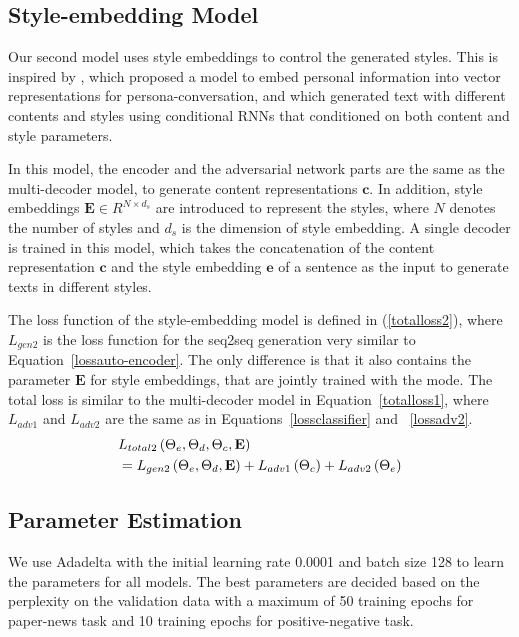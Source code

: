 \documentclass[letterpaper]{article} \usepackage{aaai18}  \usepackage{times}  \usepackage{helvet}  \usepackage{courier}  \usepackage{url}  \usepackage{graphicx}  \usepackage{amsmath}
\newcommand{\vect}[1]{\mathbf{#1}}
\newcommand{\matr}[1]{\mathbf{#1}}
\newcommand{\vc}[0]{\vect{c}}
\newcommand{\ve}[0]{\vect{e}}
\newcommand{\mE}[0]{\matr{E}}
\begin{document}
\subsection{Style-embedding Model} 
Our second model uses style embeddings to control the generated styles. 
This is inspired by \cite{li2016persona}, which proposed a model to embed 
personal information into vector representations for persona-conversation,
and \cite{ficler2017controlling} which generated text with different contents and styles 
using conditional RNNs that conditioned on both content and style parameters. 


In this model, the encoder and the adversarial network parts are the same as the  
multi-decoder model, to generate content representations $\vc$.
In addition, style embeddings $\mE \in R^{N\times d_s}$ are introduced to represent the styles, 
where $N$ denotes the number of styles and $d_s$ is the dimension of style embedding.
A single decoder is trained in this model, which takes the concatenation of the content representation 
$\vc$ and the style embedding $\ve$ of a sentence as the input to generate texts in different styles. 


The loss function of the style-embedding model is defined in (\ref{totalloss2}), 
where $L_{gen2}$ is the loss function for the seq2seq generation very similar to Equation~\ref{lossauto-encoder}. 
The only difference is that it also contains the parameter $\mE$ for style embeddings, that are 
jointly trained with the mode.
The total loss is similar to the multi-decoder model in Equation~\ref{totalloss1},  
where $L_{adv1}$ and $L_{adv2}$ are the same as in Equations~\ref{lossclassifier} and ~\ref{lossadv2}. 
{\small
\begin{align}
&L_{total2}\left( \Theta_e,\Theta_d,\Theta_c,\mE \right)  \notag \\
&= L_{gen2}\left( \Theta_e,\Theta_d,\mE \right) + L_{adv1}\left( \Theta_c \right) + L_{adv2}\left( \Theta_e \right)  \label{totalloss2}
\end{align}
}



\subsection{Parameter Estimation}
We use Adadelta \cite{zeiler2012adadelta} with the initial learning rate 0.0001 and batch size 128 to learn the parameters for all models. 
The best parameters are decided based on the perplexity on the validation data with a maximum of 50 training epochs for paper-news task and 10 training epochs for positive-negative task. 
\end{document}
